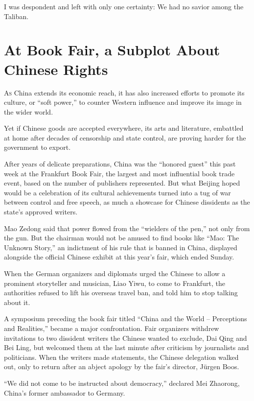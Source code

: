 ﻿\documentclass[12pt]{article}
\begin{document}
I was despondent and left with only one certainty: We had no savior among the Taliban.

\section{At Book Fair, a Subplot About Chinese Rights}

\lettrine{A}{s} China extends its economic reach, it has also increased
efforts to promote its culture, or ``soft power,'' to counter Western influence and improve its
image in the wider world.

Yet if Chinese goods are accepted everywhere, its arts and literature, embattled at home after
decades of censorship and state control, are proving harder for the government to export.

After years of delicate preparations, China was the ``honored guest'' this past week at the
Frankfurt Book Fair, the largest and most influential book trade event, based on the number of
publishers represented. But what Beijing hoped would be a celebration of its cultural achievements
turned into a tug of war between control and free speech, as much a showcase for Chinese dissidents
as the state's approved writers.

Mao Zedong said that power flowed from the ``wielders of the pen,'' not only from the gun. But the
chairman would not be amused to find books like ``Mao: The Unknown Story,'' an indictment of his
rule that is banned in China, displayed alongside the official Chinese exhibit at this year's fair,
which ended Sunday.

When the German organizers and diplomats urged the Chinese to allow a prominent storyteller and
musician, Liao Yiwu, to come to Frankfurt, the authorities refused to lift his overseas travel ban,
and told him to stop talking about it.

A symposium\cite{symposium} preceding the book fair titled ``China and the World -- Perceptions and
Realities,'' became a major confrontation. Fair organizers withdrew invitations to two dissident
writers the Chinese wanted to exclude, Dai Qing and Bei Ling, but welcomed them at the last minute
after criticism by journalists and politicians. When the writers made statements, the Chinese
delegation walked out, only to return after an abject apology by the fair's director, Jürgen Boos.

``We did not come to be instructed about democracy,'' declared Mei Zhaorong, China's former
ambassador to Germany.
\end{document}

